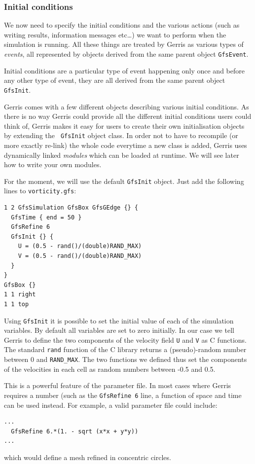\documentclass[a4paper]{article}
\begin{document}
\subsubsection{Initial conditions}

We now need to specify the initial conditions and the various actions
(such as writing results, information messages etc\dots) we want to
perform when the simulation is running. All these things are treated
by Gerris as various types of {\em events}, all represented by objects
derived from the same parent object {\tt GfsEvent}.

Initial conditions are a particular type of event happening only once
and before any other type of event, they are all derived from the same 
parent object {\tt GfsInit}.

Gerris comes with a few different objects describing various initial
conditions. As there is no way Gerris could provide all the different
initial conditions users could think of, Gerris makes it easy for
users to create their own initialisation objects by extending the {\tt
GfsInit} object class. In order not to have to recompile (or more
exactly re-link) the whole code everytime a new class is added, Gerris
uses dynamically linked {\em modules} which can be loaded at
runtime. We will see later how to write your own modules. 

For the moment, we will use the default {\tt GfsInit} object. Just add
the following lines to {\tt vorticity.gfs}:
\begin{verbatim}
1 2 GfsSimulation GfsBox GfsGEdge {} {
  GfsTime { end = 50 }
  GfsRefine 6
  GfsInit {} {
    U = (0.5 - rand()/(double)RAND_MAX)
    V = (0.5 - rand()/(double)RAND_MAX)
  }
}
GfsBox {}
1 1 right
1 1 top
\end{verbatim}
Using {\tt GfsInit} it is possible to set the initial value of each of
the simulation variables. By default all variables are set to zero
initially. In our case we tell Gerris to define the two components of
the velocity field {\tt U} and {\tt V} as C functions. The standard
{\tt rand{}} function of the C library returns a (pseudo)-random
number between 0 and {\tt RAND\_MAX}. The two functions we defined
thus set the components of the velocities in each cell as random
numbers between -0.5 and 0.5.

This is a powerful feature of the parameter file. In most cases where Gerris requires a number (such as the {\tt GfsRefine 6} line, a function of space and time can be used instead. For example, a valid parameter file could include:
\begin{verbatim}
...
  GfsRefine 6.*(1. - sqrt (x*x + y*y))
...
\end{verbatim}
which would define a mesh refined in concentric circles.
\end{document}
